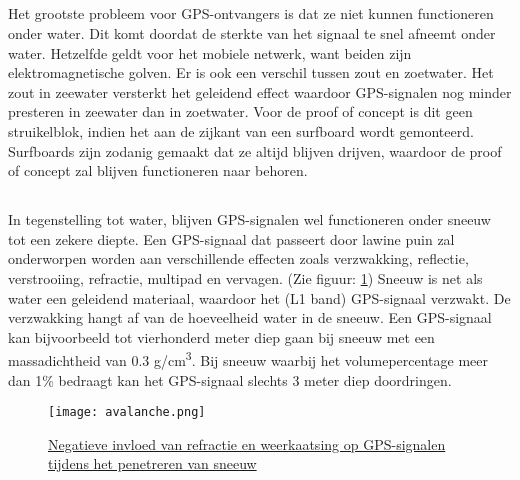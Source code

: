 \subsection{}
Het grootste probleem voor GPS-ontvangers is dat ze niet kunnen functioneren onder water. Dit komt doordat de sterkte van het signaal te snel afneemt onder water. Hetzelfde geldt voor het mobiele netwerk, want beiden zijn elektromagnetische golven. \autocite{underwater} Er is ook een verschil tussen zout en zoetwater. Het zout in zeewater versterkt het geleidend effect waardoor GPS-signalen nog minder presteren in zeewater dan in zoetwater. Voor de proof of concept is dit geen struikelblok, indien het aan de zijkant van een surfboard wordt gemonteerd. Surfboards zijn zodanig gemaakt dat ze altijd blijven drijven, waardoor de proof of concept zal blijven functioneren naar behoren.
\subsection{}
In tegenstelling tot water, blijven GPS-signalen wel functioneren onder sneeuw tot een zekere diepte. Een GPS-signaal dat passeert door lawine puin zal onderworpen worden aan verschillende effecten zoals verzwakking, reflectie, verstrooiing, refractie, multipad en vervagen. (Zie figuur: \ref{fig:avalanche}) Sneeuw is net als water een geleidend materiaal, waardoor het (L1 band) GPS-signaal verzwakt. De verzwakking hangt af van de hoeveelheid water in de sneeuw. Een GPS-signaal kan bijvoorbeeld tot vierhonderd meter diep gaan bij sneeuw met een massadichtheid van 0.3 g/cm\textsuperscript{3}. Bij sneeuw waarbij het volumepercentage meer dan 1\% bedraagt kan het GPS-signaal slechts 3 meter diep doordringen.\autocite{avalanche_gps}
\begin{figure}
    \texttt{[image: avalanche.png]}
    \caption[Negatieve invloed van refractie en weerkaatsing]{\href{https://www.researchgate.net/figure/Signal-Paths-in-Avalanche-Debris_fig1_253280455}{Negatieve invloed van refractie en weerkaatsing op GPS-signalen tijdens het penetreren van sneeuw \autocite{avalanche_gps}}}
    \label{fig:avalanche}
\end{figure}
\pagebreak